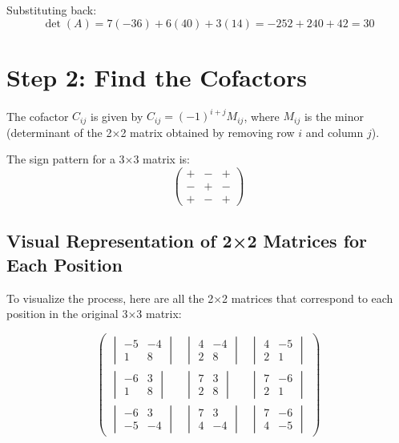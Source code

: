 \documentclass[12pt]{article}
\begin{document}
Substituting back:
\[
\det(A) = 7(-36) + 6(40) + 3(14) = -252 + 240 + 42 = 30
\]

\section{Step 2: Find the Cofactors}

The cofactor $C_{ij}$ is given by $C_{ij} = (-1)^{i+j} M_{ij}$, where $M_{ij}$ is the minor (determinant of the 2×2 matrix obtained by removing row $i$ and column $j$).

The sign pattern for a 3×3 matrix is:
\[
\begin{pmatrix}
+ & - & + \\
- & + & - \\
+ & - & +
\end{pmatrix}
\]

\subsection{Visual Representation of 2×2 Matrices for Each Position}

To visualize the process, here are all the 2×2 matrices that correspond to each position in the original 3×3 matrix:

\[
\begin{pmatrix}
\begin{vmatrix} -5 & -4 \\ 1 & 8 \end{vmatrix} & \begin{vmatrix} 4 & -4 \\ 2 & 8 \end{vmatrix} & \begin{vmatrix} 4 & -5 \\ 2 & 1 \end{vmatrix} \\[1.5em]
\begin{vmatrix} -6 & 3 \\ 1 & 8 \end{vmatrix} & \begin{vmatrix} 7 & 3 \\ 2 & 8 \end{vmatrix} & \begin{vmatrix} 7 & -6 \\ 2 & 1 \end{vmatrix} \\[1.5em]
\begin{vmatrix} -6 & 3 \\ -5 & -4 \end{vmatrix} & \begin{vmatrix} 7 & 3 \\ 4 & -4 \end{vmatrix} & \begin{vmatrix} 7 & -6 \\ 4 & -5 \end{vmatrix}
\end{pmatrix}
\]
\end{document}
